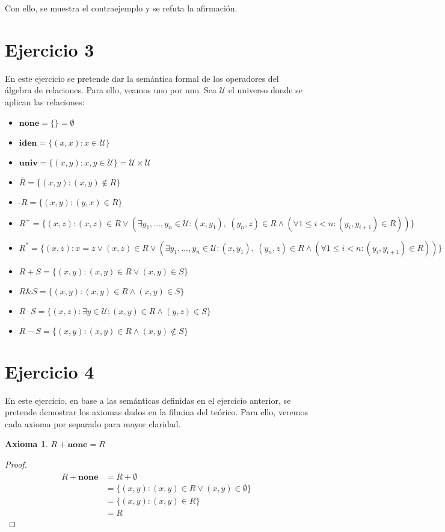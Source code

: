 \documentclass{article}
\newtheorem*{axiom}{Axioma}
\newcommand{\U}{\mathcal{U}}
\newcommand{\none}{\textbf{none}}
\newcommand{\iden}{\textbf{iden}}
\newcommand{\univ}{\textbf{univ}}
\newcommand{\conv}[1]{\ \tilde{}#1}
\begin{document}
Con ello, se muestra el contraejemplo y se refuta la afirmación.

\section*{Ejercicio 3}
En este ejercicio se pretende dar la semántica formal de los operadores del álgebra de relaciones.
Para ello, veamos uno por uno.
Sea $\U$ el universo donde se aplican las relaciones:
\begin{itemize}
  \item $\none = \{\} = \emptyset$
  \item $\iden = \{(x, x) : x \in \U\}$
  \item $\univ = \{(x, y) : x, y \in \U \} = \U \times \U$
  \item $\bar{R} = \{(x, y) : (x, y) \notin R\}$
  \item $\conv{R} = \{(x, y) : (y, x) \in R\}$
  \item $R^+ = \{(x, z) : (x, z) \in R \lor (\exists y_1, \dots, y_n \in \U : (x, y_1),\ (y_n, z) \in R \land (\forall 1 \leq i < n : (y_i, y_{i+1}) \in R))\}$
  \item $R^* = \{(x, z) : x = z \lor (x, z) \in R \lor (\exists y_1, \dots, y_n \in \U : (x, y_1),\ (y_n, z) \in R \land (\forall 1 \leq i < n : (y_i, y_{i+1}) \in R))\}$
  \item $R+S = \{(x, y) : (x, y) \in R \lor (x, y) \in S\}$
  \item $R \& S = \{(x, y) : (x, y) \in R \land (x, y) \in S\}$
  \item $R \cdot S = \{(x, z) : \exists y \in \U : (x, y) \in R \land (y, z) \in S\}$
  \item $R-S = \{(x, y) : (x, y) \in R \land (x, y) \notin S\}$
\end{itemize}

\section*{Ejercicio 4}
En este ejercicio, en base a las semánticas definidas en el ejercicio anterior, se pretende demostrar los axiomas dados en la filmina del teórico.
Para ello, veremos cada axioma por separado para mayor claridad.

\begin{axiom}
  $R + \none = R$
\end{axiom}
\begin{proof}
  \begin{equation*}
    \begin{aligned}
      R + \none &= R + \emptyset \\ 
                &= \{(x, y) : (x, y) \in R \lor (x, y) \in \emptyset\} \\ 
                &= \{(x, y) : (x, y) \in R\} \\ 
                &= R
    \end{aligned}
  \end{equation*}
\end{proof}
\end{document}
